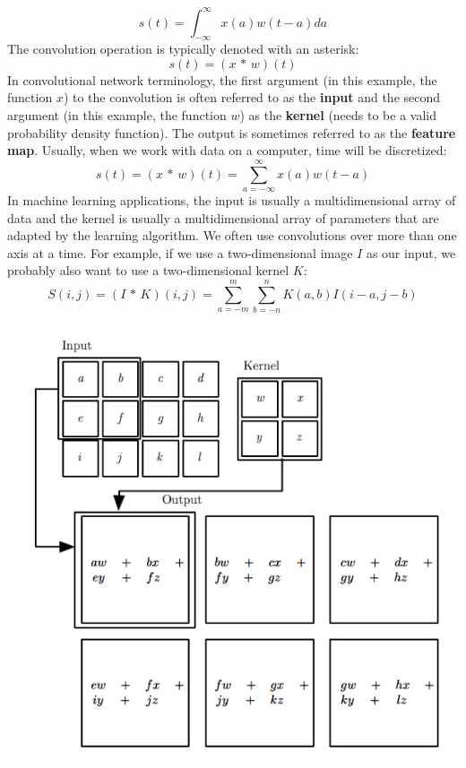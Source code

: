 \[s(t) = \int_{-\infty}^{\infty} x(a)w(t - a)da\]
The convolution operation is typically denoted with an asterisk:
\[s(t) = (x \,*\, w)(t)\]
In convolutional network terminology, the first argument (in this example, the function $x$) to the convolution is often referred to as the \textbf{input} and the second argument (in this example, the function $w$) as the \textbf{kernel} (needs to be a valid probability density function). The output is sometimes referred to as the \textbf{feature map}.\newline\newline
Usually, when we work with data on a computer, time will be discretized:
\[s(t) = (x \,*\, w)(t) = \sum_{a = - \infty}^{\infty}x(a)w(t-a)\]
In machine learning applications, the input is usually a multidimensional array of data and the kernel is usually a multidimensional array of parameters that are adapted by the learning algorithm.\newline\newline
We often use convolutions over more than one axis at a time. For
example, if we use a two-dimensional image $I$ as our input, we probably also want to use a two-dimensional kernel $K$:
\[S(i, j) = (I \, *\, K)(i, j) = \sum_{a = -m}^{m}\sum_{b = -n}^{n}K(a, b)I(i - a, j - b)\]
\begin{center}
    \includegraphics[scale=0.7]{images/Cross-corr.png}
\end{center}
